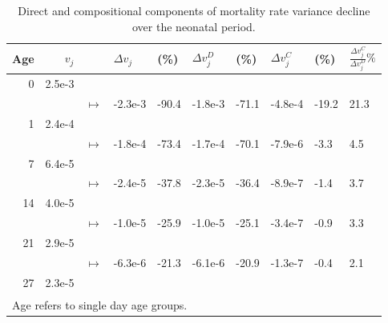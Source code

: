 \documentclass[10pt,twoside,reqno]{article}
\begin{document}
\begin{table}
\centering
\caption{\label{tab:tab-decomp-raw-variances}Direct and compositional components of mortality rate variance decline over the neonatal period.}
\centering
\begin{tabular}[t]{rrllllllll}
\toprule
Age & $v_j$ &  & $\Delta v_j$ & (\%) & $\Delta v_j^D$ &  (\%) & $\Delta v_j^C$ & (\%) & $\frac{\Delta v_j^C}{\Delta v_j^D}\%$\\
\midrule
0 & 2.5e-3 &  &  &  &  &  &  &  & \\
 &  & $\mapsto$ & -2.3e-3 & -90.4 & -1.8e-3 & -71.1 & -4.8e-4 & -19.2 & 21.3\\
1 & 2.4e-4 &  &  &  &  &  &  &  & \\
 &  & $\mapsto$ & -1.8e-4 & -73.4 & -1.7e-4 & -70.1 & -7.9e-6 & -3.3 & 4.5\\
7 & 6.4e-5 &  &  &  &  &  &  &  & \\
 &  & $\mapsto$ & -2.4e-5 & -37.8 & -2.3e-5 & -36.4 & -8.9e-7 & -1.4 & 3.7\\
14 & 4.0e-5 &  &  &  &  &  &  &  & \\
 &  & $\mapsto$ & -1.0e-5 & -25.9 & -1.0e-5 & -25.1 & -3.4e-7 & -0.9 & 3.3\\
21 & 2.9e-5 &  &  &  &  &  &  &  & \\
 &  & $\mapsto$ & -6.3e-6 & -21.3 & -6.1e-6 & -20.9 & -1.3e-7 & -0.4 & 2.1\\
27 & 2.3e-5 &  &  &  &  &  &  &  & \\
\bottomrule
\multicolumn{10}{l}{\textsuperscript{} Age refers to single day age groups.}\\
\end{tabular}
\end{table}
\end{document}
